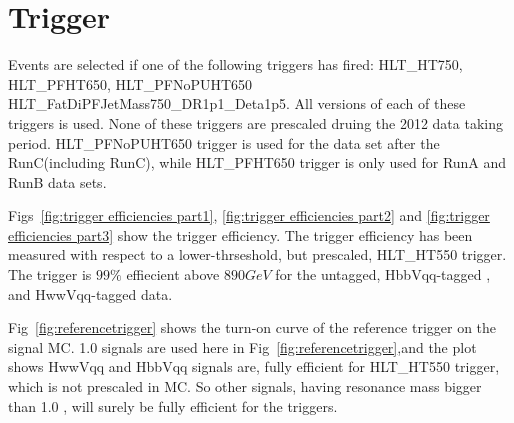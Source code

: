 \newpage

\section{Trigger}
\label{sec:trigger}


Events are selected if one of the following triggers has fired:
HLT\_HT750, HLT\_PFHT650, HLT\_PFNoPUHT650
HLT\_FatDiPFJetMass750\_DR1p1\_Deta1p5.  All versions of each of these
triggers is used. None of these triggers are prescaled druing the 2012
data taking period. HLT\_PFNoPUHT650 trigger is used for the data set
after the RunC(including RunC), while HLT\_PFHT650 trigger is only
used for RunA and RunB data sets.


Figs~\ref{fig:trigger efficiencies part1}, \ref{fig:trigger efficiencies part2} 
and \ref{fig:trigger efficiencies part3} show the trigger efficiency.
The trigger efficiency has been
measured with respect to a lower-thrseshold, but prescaled, HLT\_HT550 trigger.  
The trigger is $99\%$ effiecient above $890 GeV$ for the untagged, 
HbbVqq-tagged , and HwwVqq-tagged data.

Fig~\ref{fig:referencetrigger} shows the turn-on curve of the reference trigger on 
the signal MC. 1.0 \TeVcc signals are used here in Fig~\ref{fig:referencetrigger},and
the plot shows HwwVqq and HbbVqq signals are,  
fully efficient for HLT\_HT550 trigger, which is not prescaled in MC. So other signals,
having resonance mass bigger than 1.0 \TeVcc, will surely be fully efficient for the triggers. 



